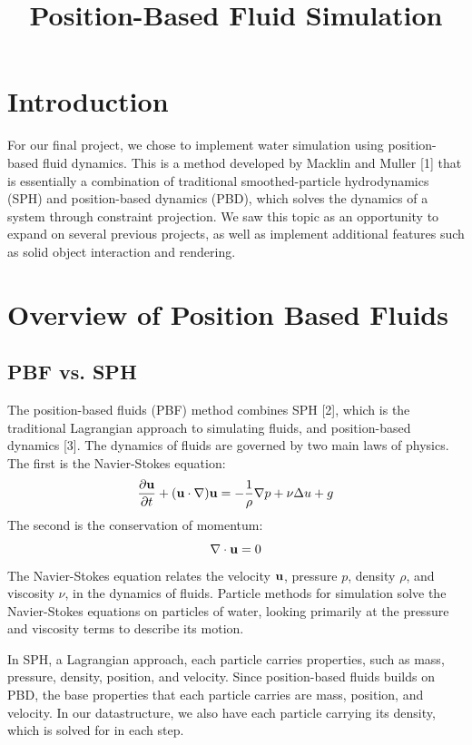 \documentclass[conference]{IEEEtran}
\title{Position-Based Fluid Simulation}
\author{\IEEEauthorblockA{Samantha Cohen} \and \IEEEauthorblockA{Sarah Leung}}
\begin{document}
\maketitle
\thispagestyle{plain}
\pagestyle{plain}

\section{Introduction}

For our final project, we chose to implement water simulation using position-based fluid dynamics. This is a method developed by Macklin and Muller [1] that is essentially a combination of traditional smoothed-particle hydrodynamics (SPH) and position-based dynamics (PBD), which solves the dynamics of a system through constraint projection. We saw this topic as an opportunity to expand on several previous projects, as well as implement additional features such as solid object interaction and rendering. 
\section{Overview of Position Based Fluids}
\subsection*{PBF vs. SPH}
The position-based fluids (PBF) method combines SPH [2], which is the traditional Lagrangian approach to simulating fluids, and position-based dynamics [3]. The dynamics of fluids are governed by two main laws of physics. The first is the Navier-Stokes equation: 
\begin{equation*}
\frac{\partial \bold u}{\partial t} + (\bold u \cdot \nabla) \bold u = -\frac{1}{\rho}\nabla p + \nu \Delta u + g
\end{equation*}
The second is the conservation of momentum: 
\begin{equation*}
\nabla \cdot \bold u = 0 
\end{equation*}
The Navier-Stokes equation relates the velocity $\bold u$, pressure $p$, density $\rho$, and viscosity $\nu$, in the dynamics of fluids. Particle methods for simulation solve the Navier-Stokes equations on particles of water, looking primarily at the pressure and viscosity terms to describe its motion. 

In SPH, a Lagrangian approach, each particle carries properties, such as mass, pressure, density, position, and velocity. Since position-based fluids builds on PBD, the base properties that each particle carries are mass, position, and velocity. In our datastructure, we also have each particle carrying its density, which is solved for in each step. 
\end{document}
